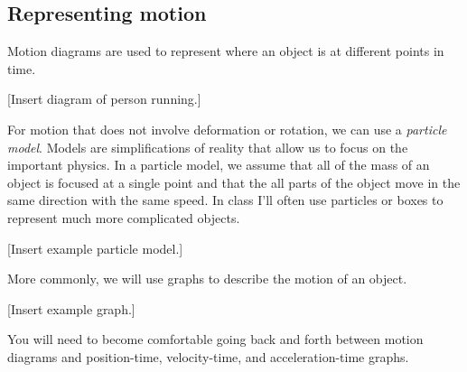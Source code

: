 \subsection{Representing motion}
Motion diagrams are used to represent where an object is at different points in time.

[Insert diagram of person running.]
\vspace{4cm}

For motion that does not involve deformation or rotation, we can use a \textit{particle model}. Models are simplifications of reality that allow us to focus on the important physics. In a particle model, we assume that all of the mass of an object is focused at a single point and that the all parts of the object move in the same direction with the same speed. In class I'll often use particles or boxes to represent much more complicated objects.

[Insert example particle model.]
\vspace{2cm}

More commonly, we will use graphs to describe the motion of an object.

[Insert example graph.]
\vspace{4cm}

You will need to become comfortable going back and forth between motion diagrams and position-time, velocity-time, and acceleration-time graphs.


